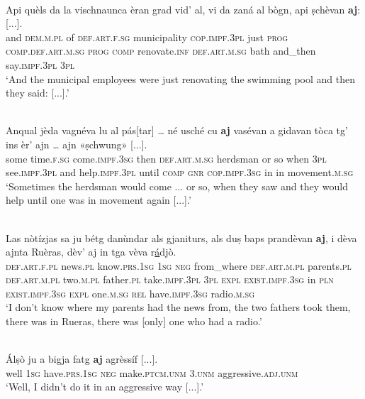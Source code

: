 \ea
\label{ex:aj:5}
\\
\gll  Api quèls da la vischnaunca èran grad vid' al, vi da zaná al bògn, api ṣchèvan \textbf{aj}: [...]. \\
and \textsc{dem.m.pl} of \textsc{def.art.f.sg} municipality \textsc{cop.impf.3pl} just \textsc{prog} \textsc{comp.def.art.m.sg} \textsc{prog} \textsc{comp} renovate.\textsc{inf} \textsc{def.art.m.sg} bath and\_then say.\textsc{impf.3pl} \textsc{3pl} \\
\glt `And the municipal employees were just renovating the swimming pool and then they said: [...].'
\z

\ea
\label{ex:aj:7}
\\
\gll  Anqual jèda vagnéva lu al pás[tar] … né usché cu \textbf{aj} vasévan a gidavan tòca tg’ ins èr’ ajn … ajn «ṣchwung»\footnotemark{} [...].\\
some time.\textsc{f.sg} come.\textsc{impf.3sg} then \textsc{def.art.m.sg} herdsman {} or so when \textsc{3pl} see.\textsc{impf.3pl} and help.\textsc{impf.3pl} until \textsc{comp} \textsc{gnr} \textsc{cop.impf.3sg} in {} in movement.\textsc{m.sg}\\
\glt `Sometimes the herdsman would come ... or so, when they saw and they would help until one was in movement again [...].'
\z

\ea
\label{ex:aj:6}
\\
\gll    Las nòtízjas sa ju bétg danùndar als gjaniturs, als duṣ baps prandèvan \textbf{aj}, i dèva ajnta Ruèras, dèv’ aj in tga vèva r\underline{á}djò.\\
\textsc{def.art.f.pl} news.\textsc{pl} know.\textsc{prs.1sg} \textsc{1sg} \textsc{neg} from\_where \textsc{def.art.m.pl} parents.\textsc{pl} \textsc{def.art.m.pl} two.\textsc{m.pl} father.\textsc{pl} take.\textsc{impf.3pl} \textsc{3pl} \textsc{expl} \textsc{exist.impf.3sg} in \textsc{pln} \textsc{exist.impf.3sg} \textsc{expl}  one.\textsc{m.sg} \textsc{rel} have.\textsc{impf.3sg} radio.\textsc{m.sg} \ \\
\glt `I don’t know where my parents had the news from, the two fathers took them, there was in Rueras, there was [only] one who had a radio.'
\z

\ea
\label{ex:aj:8}
\\
\gll  Álṣò ju a bigja fatg \textbf{aj} agrèssíf [...].\\
well \textsc{1sg} have.\textsc{prs.1sg} \textsc{neg} make.\textsc{ptcm.unm} \textsc{3.unm} aggressive.\textsc{adj.unm}\\
\glt `Well, I didn’t do it in an aggressive way [...].'
\z

